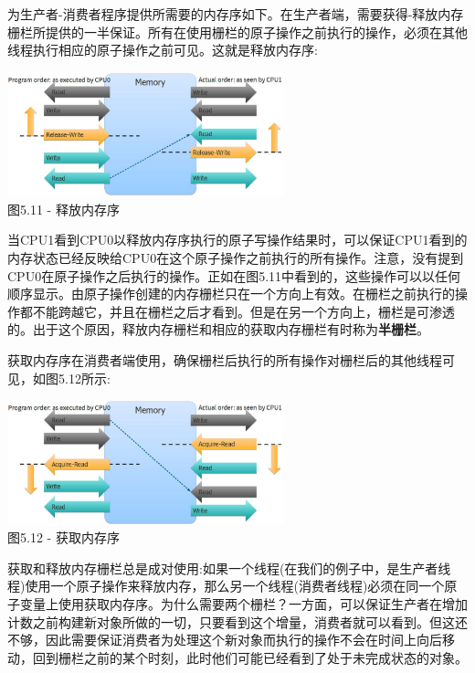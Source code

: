 为生产者-消费者程序提供所需要的内存序如下。在生产者端，需要获得-释放内存栅栏所提供的一半保证。所有在使用栅栏的原子操作之前执行的操作，必须在其他线程执行相应的原子操作之前可见。这就是释放内存序:

\begin{center}
\includegraphics[width=0.6\textwidth]{content/1/chapter5/images/11.jpg}\\
图5.11 - 释放内存序
\end{center}

当CPU1看到CPU0以释放内存序执行的原子写操作结果时，可以保证CPU1看到的内存状态已经反映给CPU0在这个原子操作之前执行的所有操作。注意，没有提到CPU0在原子操作之后执行的操作。正如在图5.11中看到的，这些操作可以以任何顺序显示。由原子操作创建的内存栅栏只在一个方向上有效。在栅栏之前执行的操作都不能跨越它，并且在栅栏之后才看到。但是在另一个方向上，栅栏是可渗透的。出于这个原因，释放内存栅栏和相应的获取内存栅栏有时称为\textbf{半栅栏}。

获取内存序在消费者端使用，确保栅栏后执行的所有操作对栅栏后的其他线程可见，如图5.12所示:

\begin{center}
\includegraphics[width=0.6\textwidth]{content/1/chapter5/images/12.jpg}\\
图5.12 - 获取内存序
\end{center}

获取和释放内存栅栏总是成对使用:如果一个线程(在我们的例子中，是生产者线程)使用一个原子操作来释放内存，那么另一个线程(消费者线程)必须在同一个原子变量上使用获取内存序。为什么需要两个栅栏？一方面，可以保证生产者在增加计数之前构建新对象所做的一切，只要看到这个增量，消费者就可以看到。但这还不够，因此需要保证消费者为处理这个新对象而执行的操作不会在时间上向后移动，回到栅栏之前的某个时刻，此时他们可能已经看到了处于未完成状态的对象。

